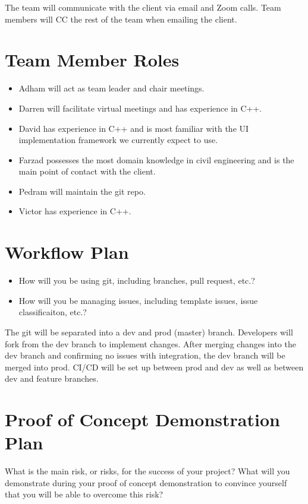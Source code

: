 \documentclass{article}
\begin{document}
The team will communicate with the client via email and Zoom calls. Team members will CC the rest of the team when emailing the client.

\section{Team Member Roles}

\begin{itemize}
	\item Adham will act as team leader and chair meetings.
	\item Darren will facilitate virtual meetings and has experience in C++.
	\item David has experience in C++ and is most familiar with the UI implementation framework we currently expect to use.
	\item Farzad possesses the most domain knowledge in civil engineering and is the main point of contact with the client.
	\item Pedram will maintain the git repo.
	\item Victor has experience in C++.
\end{itemize}

\section{Workflow Plan}

\begin{itemize}
	\item How will you be using git, including branches, pull request, etc.?
	\item How will you be managing issues, including template issues, issue
	classificaiton, etc.?
\end{itemize}

The git will be separated into a dev and prod (master) branch. Developers will fork from the dev branch to implement changes. After merging changes into the dev branch and confirming no issues with integration, the dev branch will be merged into prod. CI/CD will be set up between prod and dev as well as between dev and feature branches.

\section{Proof of Concept Demonstration Plan}

What is the main risk, or risks, for the success of your project?  What will you
demonstrate during your proof of concept demonstration to convince yourself that
you will be able to overcome this risk?
\end{document}
